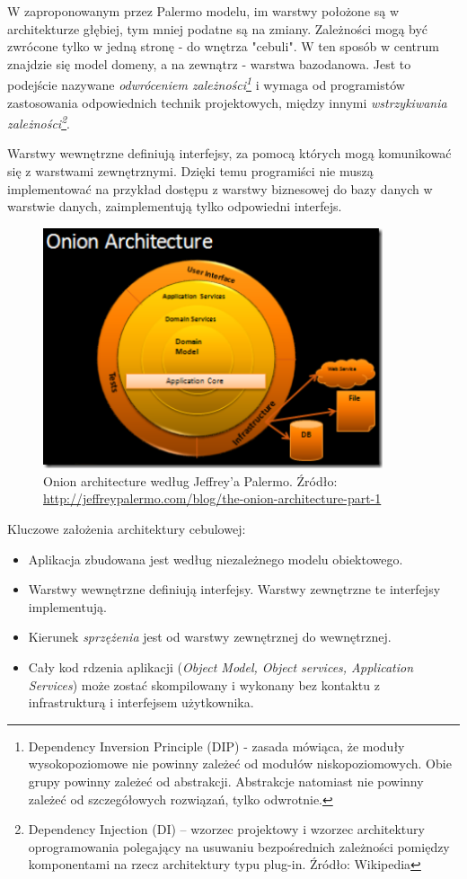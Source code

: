 W zaproponowanym przez Palermo modelu, im warstwy położone są w architekturze głębiej, tym mniej podatne są na zmiany. Zależności mogą być zwrócone tylko w jedną stronę - do wnętrza "cebuli". W ten sposób w centrum znajdzie się model domeny, a na zewnątrz - warstwa bazodanowa. Jest to podejście nazywane \textit{odwróceniem zależności\footnote{Dependency Inversion Principle (DIP) - zasada mówiąca, że moduły wysokopoziomowe nie powinny zależeć od modułów niskopoziomowych. Obie grupy powinny zależeć od abstrakcji. Abstrakcje natomiast nie powinny zależeć od szczegółowych rozwiązań, tylko odwrotnie.}} i wymaga od programistów zastosowania odpowiednich technik projektowych, między innymi \textit{wstrzykiwania zależności\footnote{Dependency Injection (DI) – wzorzec projektowy i wzorzec architektury oprogramowania polegający na usuwaniu bezpośrednich zależności pomiędzy komponentami na rzecz architektury typu plug-in. Źródło: Wikipedia}}.

Warstwy wewnętrzne definiują interfejsy, za pomocą których mogą komunikować się z warstwami zewnętrznymi. Dzięki temu programiści nie muszą implementować na przykład dostępu z warstwy biznesowej do bazy danych w warstwie danych, zaimplementują tylko odpowiedni interfejs.

\begin{figure}[!htb]
    \centering
    \includegraphics[width=10cm]{imgs/ch4_onion_architecture.png}
    \caption
{Onion architecture według Jeffrey'a Palermo. Źródło: \url{http://jeffreypalermo.com/blog/the-onion-architecture-part-1}}
    \label{fig:onion_architecture}
\end{figure} 

Kluczowe założenia architektury cebulowej:
\begin{itemize}
\item 
Aplikacja zbudowana jest według niezależnego modelu obiektowego.
\item
Warstwy wewnętrzne definiują interfejsy. Warstwy zewnętrzne te interfejsy implementują.
\item
Kierunek \textit{sprzężenia} jest od warstwy zewnętrznej do wewnętrznej.
\item
Cały kod rdzenia aplikacji (\textit{Object Model, Object services, Application Services}) może zostać skompilowany i wykonany bez kontaktu z infrastrukturą i interfejsem użytkownika.
\end{itemize}


